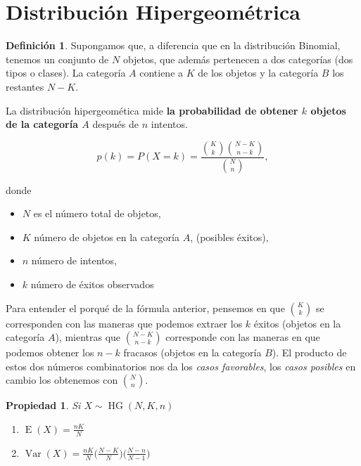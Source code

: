 \documentclass[]{book}
\providecommand{\tightlist}{%
  \setlength{\itemsep}{0pt}\setlength{\parskip}{0pt}}
\theoremstyle{plain}
\newtheorem{property}[theorem]{Propiedad}
\theoremstyle{definition}
\newtheorem{definition}[theorem]{Definición}
\theoremstyle{definition} %
\begin{document}
\section{Distribución Hipergeométrica} 

\begin{definition}
  Supongamos que, a diferencia que en la distribución Binomial, tenemos un
conjunto de \(N\) objetos, que además pertenecen a dos categorías (dos
tipos o clases). La categoría \(A\) contiene a \(K\) de los objetos y la
categoría \(B\) los restantes \(N-K\).

La distribución hipergeomética mide \textbf{la probabilidad de obtener
\(k\) objetos de la categoría \(A\)} después de \(n\) intentos.

\[\displaystyle p(k)=P(X=k)={\frac {{\binom {K}{k}}{\binom {N-K}{n-k}}}{\binom {N}{n}}},\]

donde

\begin{itemize}
\tightlist
\item
  \(N\) es el número total de objetos,
\item
  \(K\) número de objetos en la categoría \(A\), (posibles éxitos),
\item
  \(n\) número de intentos,
\item
  \(k\) número de éxitos observados
\end{itemize}

Para entender el porqué de la fórmula anterior, pensemos en que
\({\binom {K}{k}}\) se corresponden con las maneras que podemos extraer
los \(k\) éxitos (objetos en la categoría \(A\)), mientras que
\({\binom {N-K}{n-k}}\) corresponde con las maneras en que podemos
obtener los \(n-k\) fracasos (objetos en la categoría \(B\)). El
producto de estos dos números combinatorios nos da los \emph{casos
favorables}, los \emph{casos posibles} en cambio los obtenemos con
\({\binom {N}{n}}\).
\end{definition}
 

\begin{property}

  Si \(\displaystyle X\sim \operatorname {HG} (N,K,n)\)  
\begin{enumerate}
  \item $\displaystyle \operatorname {E} (X)={\frac {nK}{N}}$
  \item $\displaystyle \operatorname {Var} (X)={\frac {nK}{N}}{\bigg (}{\frac {N-K}{N}}{\bigg )}{\bigg (}{\frac {N-n}{N-1}}{\bigg )}$
\end{enumerate}
\end{property}
 
\end{document}
